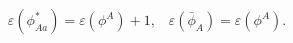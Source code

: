 \begin{equation*}
\varepsilon (\phi _{Aa}^{\ast })=\varepsilon (\phi ^{A})+1,\;\;\;\varepsilon
(\bar{\phi}_{A})=\varepsilon (\phi ^{A}).
\end{equation*}


